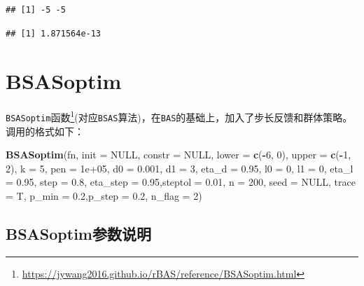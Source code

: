 \documentclass[]{ctexbook}
\newenvironment{Shaded}{\begin{snugshade}}{\end{snugshade}}
\newcommand{\KeywordTok}[1]{\textcolor[rgb]{0.13,0.29,0.53}{\textbf{#1}}}
\newcommand{\DataTypeTok}[1]{\textcolor[rgb]{0.13,0.29,0.53}{#1}}
\newcommand{\DecValTok}[1]{\textcolor[rgb]{0.00,0.00,0.81}{#1}}
\newcommand{\FloatTok}[1]{\textcolor[rgb]{0.00,0.00,0.81}{#1}}
\newcommand{\OtherTok}[1]{\textcolor[rgb]{0.56,0.35,0.01}{#1}}
\newcommand{\OperatorTok}[1]{\textcolor[rgb]{0.81,0.36,0.00}{\textbf{#1}}}
\newcommand{\NormalTok}[1]{#1}
\renewcommand{\href}[2]{#2\footnote{\url{#1}}}
\begin{document}
\begin{verbatim}
## [1] -5 -5
\end{verbatim}

\begin{verbatim}
## [1] 1.871564e-13
\end{verbatim}

\section{BSASoptim}\label{bsasoptim}

\href{https://jywang2016.github.io/rBAS/reference/BSASoptim.html}{\texttt{BSASoptim}函数}(对应\texttt{BSAS}算法)，在\texttt{BAS}的基础上，加入了步长反馈和群体策略。调用的格式如下：

\begin{Shaded}
\begin{Highlighting}[]
\KeywordTok{BSASoptim}\NormalTok{(fn, }
          \DataTypeTok{init =} \OtherTok{NULL}\NormalTok{, }\DataTypeTok{constr =} \OtherTok{NULL}\NormalTok{, }
          \DataTypeTok{lower =} \KeywordTok{c}\NormalTok{(}\OperatorTok{-}\DecValTok{6}\NormalTok{, }\DecValTok{0}\NormalTok{), }\DataTypeTok{upper =} \KeywordTok{c}\NormalTok{(}\OperatorTok{-}\DecValTok{1}\NormalTok{, }\DecValTok{2}\NormalTok{),}
          \DataTypeTok{k =} \DecValTok{5}\NormalTok{, }\DataTypeTok{pen =} \FloatTok{1e+05}\NormalTok{,}
          \DataTypeTok{d0 =} \FloatTok{0.001}\NormalTok{, }\DataTypeTok{d1 =} \DecValTok{3}\NormalTok{, }\DataTypeTok{eta_d =} \FloatTok{0.95}\NormalTok{,}
          \DataTypeTok{l0 =} \DecValTok{0}\NormalTok{, }\DataTypeTok{l1 =} \DecValTok{0}\NormalTok{, }\DataTypeTok{eta_l =} \FloatTok{0.95}\NormalTok{, }
          \DataTypeTok{step =} \FloatTok{0.8}\NormalTok{, }\DataTypeTok{eta_step =} \FloatTok{0.95}\NormalTok{,}\DataTypeTok{steptol =} \FloatTok{0.01}\NormalTok{,}
          \DataTypeTok{n =} \DecValTok{200}\NormalTok{, }\DataTypeTok{seed =} \OtherTok{NULL}\NormalTok{, }\DataTypeTok{trace =}\NormalTok{ T,  }
          \DataTypeTok{p_min =} \FloatTok{0.2}\NormalTok{,}\DataTypeTok{p_step =} \FloatTok{0.2}\NormalTok{, }\DataTypeTok{n_flag =} \DecValTok{2}\NormalTok{)}
\end{Highlighting}
\end{Shaded}

\subsection{BSASoptim参数说明}\label{BSASparms}
\end{document}
